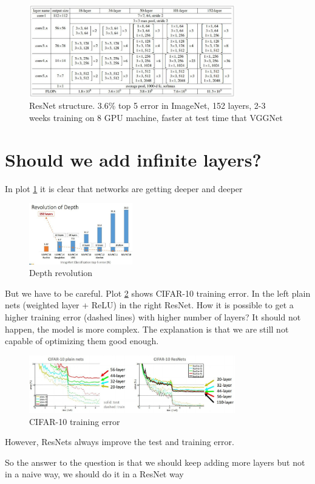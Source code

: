 \begin{figure}[h]
  \centering
  \includegraphics[width=0.8\textwidth]{Images/famous_networks/9.png}
  \caption{ResNet structure. 3.6\% top 5 error in ImageNet, 152 layers, 2-3 weeks training on 8 GPU machine, faster at test time that VGGNet}
\end{figure}

\section*{Should we add infinite layers?}
In plot \ref{fig:depth_rev} it is clear that networks are getting deeper and deeper
\begin{figure}[h]
  \centering
  \includegraphics[width=0.4\textwidth]{Images/famous_networks/10.png}
  \caption{Depth revolution}
  \label{fig:depth_rev}
\end{figure}
But we have to be careful. Plot \ref{fig:cifar_train_error} shows CIFAR-10 training error. In the left plain nets (weighted layer + ReLU) in the right ResNet. How it is possible to get a higher training error (dashed lines) with higher number of layers? It should not happen, the model is more complex. The explanation is that we are still not capable of optimizing them good enough.

\begin{figure}[h]
  \centering
  \includegraphics[width=0.8\textwidth]{Images/famous_networks/11.png}
  \caption{CIFAR-10 training error}
  \label{fig:cifar_train_error}
\end{figure}

However, ResNets always improve the test and training error.

So the answer to the question is that we should keep adding more layers but not in a naive way, we should do it in a ResNet way
